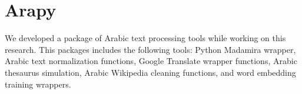 \section{Arapy}

We developed a package of Arabic text processing tools while working on this research. This packages includes the following tools: Python Madamira wrapper, Arabic text normalization functions, Google Translate wrapper functions, Arabic thesaurus simulation, Arabic Wikipedia cleaning functions, and word embedding training wrappers.

\label{sec:arapy}
